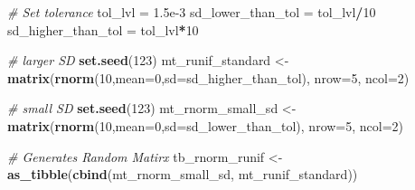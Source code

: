 \documentclass[
]{book}
\newenvironment{Shaded}{\begin{snugshade}}{\end{snugshade}}
\newcommand{\CommentTok}[1]{\textcolor[rgb]{0.56,0.35,0.01}{\textit{#1}}}
\newcommand{\DataTypeTok}[1]{\textcolor[rgb]{0.13,0.29,0.53}{#1}}
\newcommand{\DecValTok}[1]{\textcolor[rgb]{0.00,0.00,0.81}{#1}}
\newcommand{\FloatTok}[1]{\textcolor[rgb]{0.00,0.00,0.81}{#1}}
\newcommand{\KeywordTok}[1]{\textcolor[rgb]{0.13,0.29,0.53}{\textbf{#1}}}
\newcommand{\NormalTok}[1]{#1}
\newcommand{\OperatorTok}[1]{\textcolor[rgb]{0.81,0.36,0.00}{\textbf{#1}}}
\newcommand{\StringTok}[1]{\textcolor[rgb]{0.31,0.60,0.02}{#1}}
\begin{document}
\begin{Shaded}
\begin{Highlighting}[]
\CommentTok{\# Set tolerance }
\NormalTok{tol\_lvl =}\StringTok{ }\FloatTok{1.5e{-}3}
\NormalTok{sd\_lower\_than\_tol =}\StringTok{ }\NormalTok{tol\_lvl}\OperatorTok{/}\DecValTok{10}
\NormalTok{sd\_higher\_than\_tol =}\StringTok{ }\NormalTok{tol\_lvl}\OperatorTok{*}\DecValTok{10}

\CommentTok{\# larger SD}
\KeywordTok{set.seed}\NormalTok{(}\DecValTok{123}\NormalTok{)}
\NormalTok{mt\_runif\_standard \textless{}{-}}\StringTok{ }\KeywordTok{matrix}\NormalTok{(}\KeywordTok{rnorm}\NormalTok{(}\DecValTok{10}\NormalTok{,}\DataTypeTok{mean=}\DecValTok{0}\NormalTok{,}\DataTypeTok{sd=}\NormalTok{sd\_higher\_than\_tol), }\DataTypeTok{nrow=}\DecValTok{5}\NormalTok{, }\DataTypeTok{ncol=}\DecValTok{2}\NormalTok{)}

\CommentTok{\# small SD}
\KeywordTok{set.seed}\NormalTok{(}\DecValTok{123}\NormalTok{)}
\NormalTok{mt\_rnorm\_small\_sd \textless{}{-}}\StringTok{ }\KeywordTok{matrix}\NormalTok{(}\KeywordTok{rnorm}\NormalTok{(}\DecValTok{10}\NormalTok{,}\DataTypeTok{mean=}\DecValTok{0}\NormalTok{,}\DataTypeTok{sd=}\NormalTok{sd\_lower\_than\_tol), }\DataTypeTok{nrow=}\DecValTok{5}\NormalTok{, }\DataTypeTok{ncol=}\DecValTok{2}\NormalTok{)}

\CommentTok{\# Generates Random Matirx}
\NormalTok{tb\_rnorm\_runif \textless{}{-}}\StringTok{ }\KeywordTok{as\_tibble}\NormalTok{(}\KeywordTok{cbind}\NormalTok{(mt\_rnorm\_small\_sd, mt\_runif\_standard))}


\end{Highlighting}
\end{Shaded}
\end{document}
